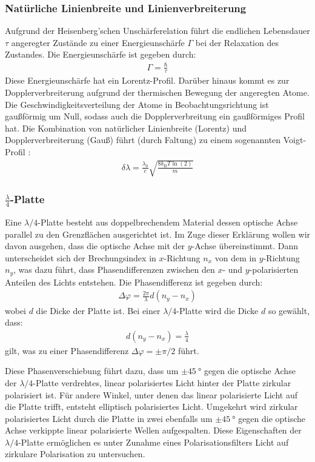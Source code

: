 \documentclass[11pt, a4paper]{article}
\begin{document}
\subsubsection{Natürliche Linienbreite und Linienverbreiterung}
Aufgrund der Heisenberg'schen Unschärferelation führt die endlichen Lebensdauer $\tau$ angeregter Zustände zu einer Energieunschärfe $\Gamma$ bei der Relaxation des Zustandes.
Die Energieunschärfe ist gegeben durch:
\begin{align*}
	\Gamma = \frac{\hbar}{\tau}
\end{align*}
Diese Energieunschärfe hat ein Lorentz-Profil.
Darüber hinaus kommt es zur Dopplerverbreiterung aufgrund der thermischen Bewegung der angeregten Atome.
Die Geschwindigkeitsverteilung der Atome in Beobachtungsrichtung ist gaußförmig um Null, sodass auch die Dopplerverbreitung ein gaußförmiges Profil hat.
Die Kombination von natürlicher Linienbreite (Lorentz) und Dopplerverbreiterung (Gauß) führt (durch Faltung) zu einem sogenannten Voigt-Profil \cite{siegmann}:
\begin{align*}
	\delta \lambda = \frac{\lambda_0}{c} \sqrt{\frac{8 k_\mathrm{B} T \ln(2)}{m}}
\end{align*}

\subsubsection{$\frac{\lambda}{4}$-Platte}
Eine $\lambda/4$-Platte besteht aus doppelbrechendem Material dessen optische Achse parallel zu den Grenzflächen ausgerichtet ist.
Im Zuge dieser Erklärung wollen wir davon ausgehen, dass die optische Achse mit der $y$-Achse übereinstimmt.
Dann unterscheidet sich der Brechungsindex in $x$-Richtung $n_x$ von dem in $y$-Richtung $n_y$, was dazu führt, dass Phasendifferenzen zwischen den $x$- und $y$-polarisierten Anteilen des Lichts entstehen.
Die Phasendifferenz ist gegeben durch:
\begin{align*}
	\Delta \varphi = \frac{2 \pi}{\lambda} d \left(n_y - n_x\right)
\end{align*}
wobei $d$ die Dicke der Platte ist.
Bei einer $\lambda / 4$-Platte wird die Dicke $d$ so gewählt, dass:
\begin{align*}
	d (n_y - n_x) = \frac{\lambda}{4}
\end{align*}
gilt, was zu einer Phasendifferenz $\Delta \varphi = \pm \pi / 2$ führt.

Diese Phasenverschiebung führt dazu, dass um $\pm\SI{45}{\degree}$ gegen die optische Achse der $\lambda/4$-Platte verdrehtes, linear polarisiertes Licht hinter der Platte zirkular polarisiert ist.
Für andere Winkel, unter denen das linear polarisierte Licht auf die Platte trifft, entsteht elliptisch polarisiertes Licht.
Umgekehrt wird zirkular polarisiertes Licht durch die Platte in zwei ebenfalls um $\pm\SI{45}{\degree}$ gegen die optische Achse verkippte linear polarisierte Wellen aufgespalten.
Diese Eigenschaften der $\lambda/4$-Platte ermöglichen es unter Zunahme eines Polarisationsfilters Licht auf zirkulare Polarisation zu untersuchen.
\end{document}
